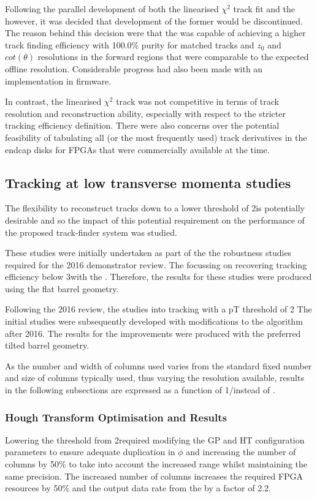 Following the parallel development of both the linearised $\chi^{2}$ track fit and the \KF however, it was decided that development of the former would be discontinued.
The reason behind this decision were that the \KF was capable of achieving a higher track finding efficiency with 100.0\% purity for matched tracks and $z_{0}$ and $cot(\theta)$ resolutions in the forward regions that were comparable to the expected offline resolution.
Considerable progress had also been made with an implementation in firmware.

In contrast, the linearised $\chi^{2}$ track was not competitive in terms of track resolution and reconstruction ability, especially with respect to the stricter tracking efficiency definition.
There were also concerns over the potential feasibility of tabulating all (or the most frequently used) track derivatives in the endcap disks for FPGAs that were commercially available at the time.

\subsection{Tracking at low transverse momenta studies}\label{subsec:Tmtt2GeV}
The flexibility to reconstruct tracks down to a lower \pT threshold of 2\GeV is potentially desirable and so the impact of this potential requirement on the performance of the proposed track-finder system was studied.

These studies were initially undertaken as part of the the robustness studies required for the 2016 demonstrator review.
The focussing on recovering tracking efficiency below 3\GeV with the \HT.
Therefore, the results for these studies were produced using the flat barrel geometry.

Following the 2016 review, the studies into tracking with a pT threshold of 2\GeV 
The initial studies were subsequently developed with modifications to the \KF algorithm after 2016.
The results for the \KF improvements were produced with the preferred tilted barrel geometry.

As the number and width of \qpt \HT columns used varies from the standard fixed number and size of columns typically used, thus varying the \pT resolution available, results in the following subsections are expressed as a function of 1/\pT instead of \pT.

\subsubsection{Hough Transform Optimisation and Results}\label{subsubsec:lowPtOptHT}
Lowering the \pT threshold from 2\GeVc required modifying the GP and HT configuration parameters to ensure adequate duplication in $\phi$ and increasing the number of \qpt columns by 50\% to take into account the increased \pt range whilst maintaining the same precision.
The increased number of \qpt columns increases the required FPGA resources by 50\% and the output data rate from the \HT by a factor of 2.2.

